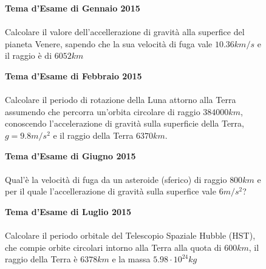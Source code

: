 \begin{figure}[h!]
\textbf{Tema d'Esame di Gennaio 2015}\\ \\
Calcolare il valore dell'accellerazione di gravità alla superfice del pianeta Venere, sapendo che la sua velocità di fuga vale $10.36km/s$ e il raggio è di $6052km$
\end{figure}

\begin{figure}[h!]
\textbf{Tema d'Esame di Febbraio 2015}\\ \\
Calcolare il periodo di rotazione della Luna attorno alla Terra assumendo che percorra un'orbita circolare di raggio $384000 km$, conoscendo l'accelerazione di gravità sulla superficie della Terra, $g = 9.8 m/s^2$
 e il raggio della Terra $6370 km$. 
\end{figure}

\begin{figure}[h!]
\textbf{Tema d'Esame di Giugno 2015}\\ \\
Qual'è la velocità di fuga da un asteroide (sferico) di raggio $800km$ e per il quale l'accellerazione di gravità sulla superfice vale $6m/s^2$?
\end{figure}

\begin{figure}[h!]
\textbf{Tema d'Esame di Luglio 2015}\\ \\
Calcolare il periodo orbitale del Telescopio Spaziale Hubble (HST), che compie orbite circolari intorno alla Terra alla quota di $600km$, il raggio della Terra è $6378km$ e la massa $5.98\cdot 10^{24}kg$
\end{figure}